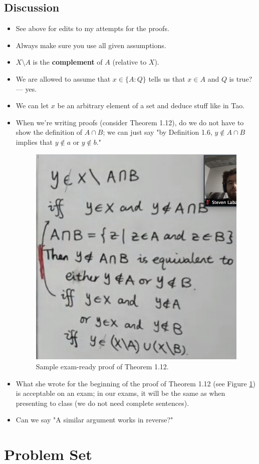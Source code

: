 \documentclass[titlepage]{article}
\theoremstyle{definition}
\begin{document}
\subsection{Discussion}
\begin{itemize}
    \item {}See above for edits to my attempts for the proofs.
    \item Always make sure you use all given assumptions.
    \item $X\setminus A$ is the \textbf{complement} of $A$ (relative to $X$).
    \item We are allowed to assume that $x\in\{A:Q\}$ tells us that $x\in A$ and $Q$ is true? --- yes.
    \item We can let $x$ be an arbitrary element of a set and deduce stuff like in Tao.
    \item When we're writing proofs (consider Theorem 1.12), do we do not have to show the definition of $A\cap B$; we can just say "by Definition 1.6, $y\notin A\cap B$ implies that $y\notin a$ or $y\notin b$."
    \begin{figure}[h!]
        \centering
        \includegraphics[width=0.3\linewidth]{ExtFiles/SampleTrm1-12Proof.png}
        \caption{Sample exam-ready proof of Theorem 1.12.}
        \label{fig:sampleTrm1-12Proof}
    \end{figure}
    \item What she wrote for the beginning of the proof of Theorem 1.12 (see Figure \ref{fig:sampleTrm1-12Proof}) is acceptable on an exam; in our exams, it will be the same as when presenting to class (we do not need complete sentences).
    \item Can we say "A similar argument works in reverse?"
\end{itemize}



\section{Problem Set}
\end{document}
